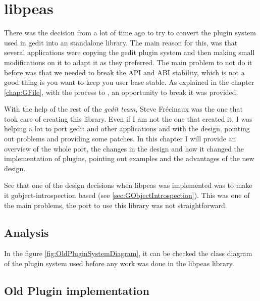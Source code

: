 
\chapter{libpeas}

There was the decision from a lot of time ago to try to convert the plugin system used in gedit into an standalone library. The main reason for this, was that several applications were copying the gedit plugin system and then making small modifications on it to adapt it as they preferred. The main problem to not do it before was that we needed to break the API and ABI stability, which is not a good thing is you want to keep you user base stable. As explained in the chapter \ref{chap:GFile}, with the process to , an opportunity to break it was provided.

With the help of the rest of the \emph{gedit team}, Steve Fr\'ecinaux was the one that took care of creating this library. Even if I am not the one that created it, I was helping a lot to port gedit and other applications and with the design, pointing out problems and providing some patches. In this chapter I will provide an overview of the whole port, the changes in the design and how it changed the implementation of plugins, pointing out examples and the advantages of the new design.

See that one of the design decisions when libpeas was implemented was to make it gobject-introspection based (see \ref{sec:GObjectIntrospection}). This was one of the main problems, the port to use this library was not straightforward.

\section{Analysis}


In the figure \ref{fig:OldPluginSystemDiagram}, it can be checked the class diagram of the plugin system used before any work was done in the libpeas library.



\section{Old Plugin implementation}

